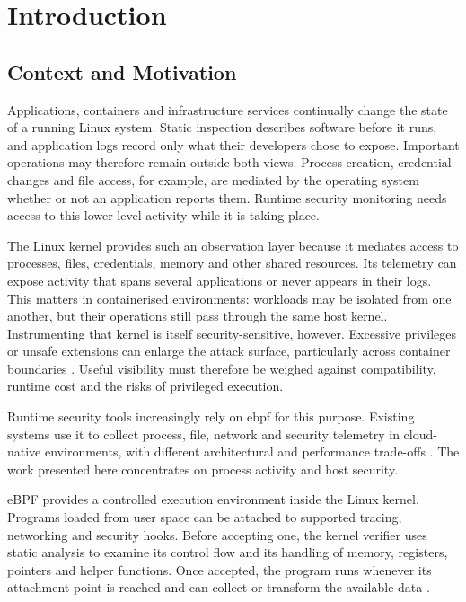 \chapter{Introduction}
\label{ch:introduction}

\section{Context and Motivation}
\label{sec:introduction-context-motivation}

Applications, containers and infrastructure services continually change the state of a running Linux system. Static inspection describes software before it runs, and application logs record only what their developers chose to expose. Important operations may therefore remain outside both views. Process creation, credential changes and file access, for example, are mediated by the operating system whether or not an application reports them. Runtime security monitoring needs access to this lower-level activity while it is taking place.

The Linux kernel provides such an observation layer because it mediates access to processes, files, credentials, memory and other shared resources. Its telemetry can expose activity that spans several applications or never appears in their logs. This matters in containerised environments: workloads may be isolated from one another, but their operations still pass through the same host kernel. Instrumenting that kernel is itself security-sensitive, however. Excessive privileges or unsafe extensions can enlarge the attack surface, particularly across container boundaries \cite{he2023crosscontainer}. Useful visibility must therefore be weighed against compatibility, runtime cost and the risks of privileged execution.

Runtime security tools increasingly rely on \gls{ebpf} for this purpose. Existing systems use it to collect process, file, network and security telemetry in cloud-native environments, with different architectural and performance trade-offs \cite{her2025ebpfsecuritytools}. The work presented here concentrates on process activity and host security.

eBPF provides a controlled execution environment inside the Linux kernel. Programs loaded from user space can be attached to supported tracing, networking and security hooks. Before accepting one, the kernel verifier uses static analysis to examine its control flow and its handling of memory, registers, pointers and helper functions. Once accepted, the program runs whenever its attachment point is reached and can collect or transform the available data \cite{gbadamosi2024ebpf,linux2024ebpfuserspaceapi,linux2026ebpfverifier}.

